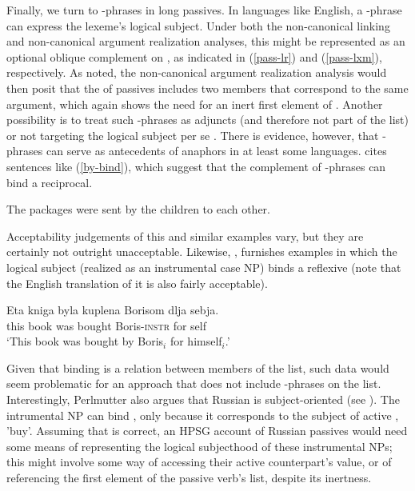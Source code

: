 \documentclass[output=paper
                ,modfonts
                ,nonflat
	        ,collection
	        ,collectionchapter
	        ,collectiontoclongg
 	        ,biblatex
                ,babelshorthands
                ,newtxmath
                ,draftmode
                ,colorlinks, citecolor=brown
]{./langsci/langscibook}
\begin{document}

Finally, we turn to -phrases in long passives.
In languages like English, a -phrase can express the lexeme's logical subject.
Under both the non-canonical linking and non-canonical argument realization analyses, this might be represented as an optional oblique complement on \argst, as indicated in (\ref{pass-lr}) and (\ref{pass-lxm}), respectively.
As noted, the non-canonical argument realization analysis would then posit that the \argst of passives includes two members that correspond to the same argument, which again shows the need for an inert first element of \argst.
Another possibility is to treat such -phrases as adjuncts (and therefore not part of the \argst list) or not targeting the logical subject per se \citep{Jackendoff1990}.
There is evidence, however, that -phrases can serve as antecedents of anaphors in at least some languages.
\citet[111]{Collins2005} cites sentences like (\ref{by-bind}), which suggest that the complement of -phrases can bind a reciprocal.

\begin{exe}
\ex\label{by-bind}The packages were sent by the children to each other.
\end{exe} 

Acceptability judgements of this and similar examples vary, but they are certainly not outright unacceptable.  Likewise, \citet{Perlmutter1984}, furnishes  examples in which the logical subject (realized as an instrumental case NP) binds a reflexive (note that the English translation of it is also fairly acceptable).

\begin{exe}
\ex     \label{russian-pass}
             \gll Eta kniga byla kuplena Borisom dlja sebja.  \\
             this book was bought Boris-\textsc{instr} for self  \\
             \glt `This book was bought by Boris$_{i}$ for himself$_{i}$.'
\end{exe}

Given that binding is a relation between members of the \argst list, such data would seem problematic for an approach that does not include -phrases on the \argst list.
Interestingly, Perlmutter also argues that Russian  is subject-oriented (see ).
The intrumental NP  can bind , only because it corresponds to the subject of active , 'buy'.
Assuming that is correct, an HPSG account of Russian passives would need some means of representing the logical subjecthood of these instrumental NPs; this might involve some way of accessing their active counterpart's \subj value, or of referencing the first element of the passive verb's \argst list, despite its inertness.
\end{document}
